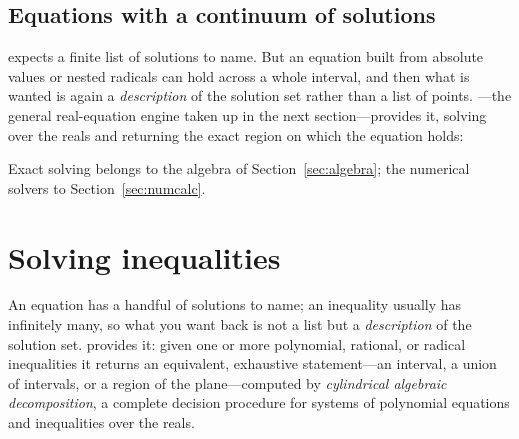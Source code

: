 \subsection{Equations with a continuum of solutions}

 expects a finite list of solutions to name. But an equation built from
absolute values or nested radicals can hold across a whole interval, and then what
is wanted is again a \emph{description} of the solution set rather than a list of points.
---the general real-equation engine taken up in the next
section---provides it, solving over the reals and returning the exact region on
which the equation holds:

\begin{codepairs}
\end{codepairs}

Exact solving belongs to the algebra of Section~\ref{sec:algebra}; the numerical
solvers to Section~\ref{sec:numcalc}.

\section{Solving inequalities}
\label{sec:intro-inequalities}

An equation has a handful of solutions to name; an inequality usually
has infinitely many, so what you want back is not a list but a \emph{description} of the
solution set.  provides it: given one or more polynomial,
rational, or radical inequalities it returns an equivalent, exhaustive statement---an
interval, a union of intervals, or a region of the plane---computed by \emph{cylindrical
algebraic
decomposition}, a complete decision
procedure for systems of polynomial equations and inequalities
over the reals.


